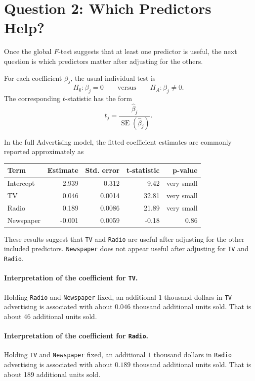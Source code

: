 \section{Question 2: Which Predictors Help?}

Once the global \(F\)-test suggests that at least one predictor is useful, the next question is which predictors matter after adjusting for the others.

For each coefficient \(\beta_j\), the usual individual test is
\begin{equation}
  H_0:\beta_j=0
  \qquad\text{versus}\qquad
  H_A:\beta_j\neq 0.
\end{equation}
The corresponding \(t\)-statistic has the form
\begin{equation}
  t_j=\frac{\widehat{\beta}_j}{\operatorname{SE}(\widehat{\beta}_j)}.
\end{equation}

In the full Advertising model, the fitted coefficient estimates are commonly reported approximately as
\begin{center}
\begin{tabular}{lrrrr}
\toprule
\textbf{Term} & \textbf{Estimate} & \textbf{Std. error} & \textbf{t-statistic} & \textbf{p-value}\\
\midrule
Intercept & 2.939 & 0.312 & 9.42 & very small\\
TV & 0.046 & 0.0014 & 32.81 & very small\\
Radio & 0.189 & 0.0086 & 21.89 & very small\\
Newspaper & -0.001 & 0.0059 & -0.18 & 0.86\\
\bottomrule
\end{tabular}
\end{center}

These results suggest that \texttt{TV} and \texttt{Radio} are useful after adjusting for the other included predictors.  \texttt{Newspaper} does not appear useful after adjusting for \texttt{TV} and \texttt{Radio}.

\paragraph{Interpretation of the coefficient for \texttt{TV}.}
Holding \texttt{Radio} and \texttt{Newspaper} fixed, an additional \(1\) thousand dollars in \texttt{TV} advertising is associated with about \(0.046\) thousand additional units sold.  That is about 46 additional units sold.

\paragraph{Interpretation of the coefficient for \texttt{Radio}.}
Holding \texttt{TV} and \texttt{Newspaper} fixed, an additional \(1\) thousand dollars in \texttt{Radio} advertising is associated with about \(0.189\) thousand additional units sold.  That is about 189 additional units sold.

